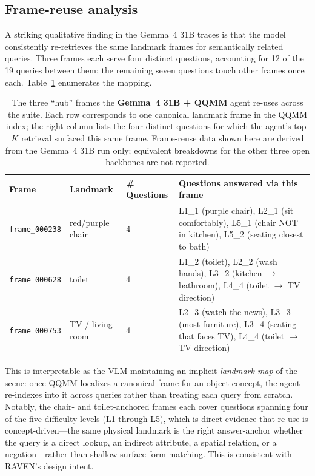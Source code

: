 \documentclass[12pt,letterpaper,oneside]{article}
\begin{document}
\subsection{Frame-reuse analysis}\label{sec:framereuse}

A striking qualitative finding in the Gemma~4 31B traces is that the
model consistently re-retrieves the same landmark frames for
semantically related queries.  Three frames each serve four distinct
questions, accounting for 12 of the 19 queries between them; the
remaining seven questions touch other frames once each.
Table~\ref{tab:hubs} enumerates the mapping.

\begin{table}[ht]
  \centering
  \caption{The three ``hub'' frames the \textbf{Gemma~4 31B + QQMM}
    agent re-uses across the suite.  Each row corresponds to one
    canonical landmark frame in the QQMM index; the right column
    lists the four distinct questions for which the agent's top-$K$
    retrieval surfaced this same frame.  Frame-reuse data shown here
    are derived from the Gemma~4 31B run only; equivalent breakdowns
    for the other three open backbones are not reported.}
  \label{tab:hubs}
  \small
  \begin{tabularx}{\textwidth}{@{}lllX@{}}
    \toprule
    Frame & Landmark & \# Questions & Questions answered via this frame \\
    \midrule
    \texttt{frame\_000238} & red/purple chair  & 4 &
      L1\_1 (purple chair),
      L2\_1 (sit comfortably),
      L5\_1 (chair NOT in kitchen),
      L5\_2 (seating closest to bath) \\
    \texttt{frame\_000628} & toilet            & 4 &
      L1\_2 (toilet),
      L2\_2 (wash hands),
      L3\_2 (kitchen $\to$ bathroom),
      L4\_4 (toilet $\to$ TV direction) \\
    \texttt{frame\_000753} & TV / living room  & 4 &
      L2\_3 (watch the news),
      L3\_3 (most furniture),
      L3\_4 (seating that faces TV),
      L4\_4 (toilet $\to$ TV direction) \\
    \bottomrule
  \end{tabularx}
\end{table}

This is interpretable as the VLM maintaining an implicit
\emph{landmark map} of the scene: once QQMM localizes a canonical
frame for an object concept, the agent re-indexes into it across
queries rather than treating each query from scratch.  Notably, the
chair- and toilet-anchored frames each cover questions spanning four
of the five difficulty levels (L1 through L5), which is direct
evidence that re-use is concept-driven---the same physical landmark
is the right answer-anchor whether the query is a direct lookup, an
indirect attribute, a spatial relation, or a negation---rather than
shallow surface-form matching.  This is consistent with RAVEN's
design intent.
\end{document}
